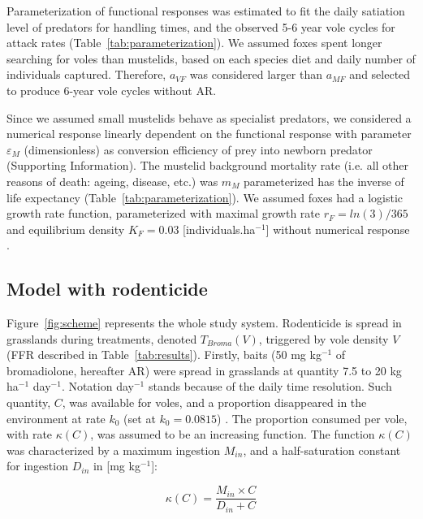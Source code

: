 \documentclass[11pt]{article}
\begin{document}
Parameterization of functional responses was estimated to fit the daily satiation level of predators for handling times, and the observed 5-6 year vole cycles for attack rates (Table~\ref{tab:parameterization}). We assumed foxes spent longer searching for voles than mustelids, based on each species diet and daily number of individuals captured. Therefore, $a_{VF}$ was considered larger than $a_{MF}$ and selected to produce 6-year vole cycles without AR.


Since we assumed small mustelids behave as specialist predators, we considered a numerical response linearly dependent on the functional response with parameter $\varepsilon_M$ (dimensionless) as conversion efficiency of prey into newborn predator (Supporting Information). The mustelid background mortality rate (i.e. all other reasons of death: ageing, disease, etc.) was $m_M$ parameterized has the inverse of life expectancy (Table~\ref{tab:parameterization}). 
We assumed foxes had a logistic growth rate function, parameterized with maximal growth rate $r_F = ln(3)/365$ and equilibrium density $K_F = 0.03$ [individuals.ha$^{-1}$] \citep{Ruette2003} without numerical response \citep{Weber2002}. 

\subsection{Model with rodenticide}

Figure~\ref{fig:scheme} represents the whole study system. Rodenticide is spread in grasslands during treatments, denoted $T_{Broma}(V)$, triggered by vole density $V$ (FFR described in Table~\ref{tab:results}).
%
Firstly, baits (50 mg kg$^{-1}$  of bromadiolone, hereafter AR) were spread in grasslands at quantity 7.5 to 20 kg ha$^{-1}$ day$^{-1}$. Notation day$^{-1}$ stands because of the daily time resolution.
%
Such quantity, $C$, was available for voles, and a proportion disappeared in the environment at rate $k_0$ (set at $k_0 = 0.0815$) \citep{Sage2008}. The proportion consumed per vole, with rate $\kappa(C)$, was assumed to be an increasing function. The function $\kappa(C)$ was characterized by a maximum ingestion $M_{in}$, and a half-saturation constant for ingestion $D_{in}$ in [mg kg$^{-1}$]:

\begin{equation}
\kappa(C)= \dfrac{M_{in}\times C}{D_{in} + C}
\end{equation}
\end{document}
